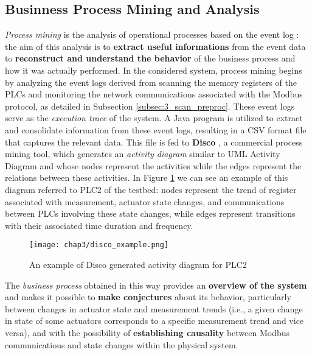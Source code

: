 \subsection{Businness Process Mining and Analysis}
\label{subsec:ceccato_businessprocess}
\textit{Process mining} is the analysis of operational processes based on the event log \cite{process_mining_def}: the aim of this analysis is to \textbf{extract useful informations} from the event data to \textbf{reconstruct and understand the behavior} of the business process and how it was actually performed.\newline\newline
In the considered system, process mining begins by analyzing the event logs derived from scanning the memory registers of the PLCs and monitoring the network communications associated with the Modbus protocol, as detailed in Subsection \ref{subsec:3_scan_preproc}. These event logs serve as the \textit{execution trace} of the system. A Java program is utilized to extract and consolidate information from these event logs, resulting in a CSV format file that captures the relevant data.\newline
This file is fed to \textbf{Disco} \cite{disco}, a commercial process mining tool, which generates an \textit{activity diagram} similar to UML Activity Diagram and whose nodes represent the activities while the edges represent the relations between these activities. In Figure \ref{fig:disco_example} we can see an example of this diagram referred to PLC2 of the testbed: nodes represent the trend of register associated with measurement, actuator state changes, and communications between PLCs involving these state changes, while edges represent transitions with their associated time duration and frequency.

\begin{figure}[ht]
	\centering
	\texttt{[image: chap3/disco\_example.png]}
	\caption{An example of Disco generated activity diagram for PLC2}
	\label{fig:disco_example}
\end{figure}

The \textit{business process} obtained in this way provides an \textbf{overview of the system} and makes it possible to \textbf{make conjectures} about its behavior, particularly between changes in actuator state and measurement trends (i.e., a given change in state of some actuators corresponds to a specific measurement trend and vice versa), and with the possibility of \textbf{establishing causality} between Modbus communications and state changes within the physical system.

